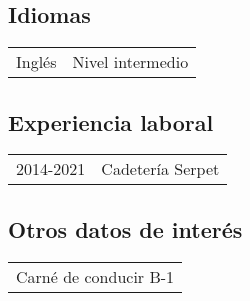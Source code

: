 \documentclass[12pt]{article}
\begin{document}
\subsection*{Idiomas}
\begin{tabular}{l l}
  Inglés&Nivel intermedio\\
\end{tabular}
\subsection*{Experiencia laboral}
\begin{tabular}{l l}
  2014-2021&Cadetería Serpet\\
\end{tabular}
\subsection*{Otros datos de interés}
\begin{tabular}{l}
  Carné de conducir B-1\\
\end{tabular}
\end{document}
